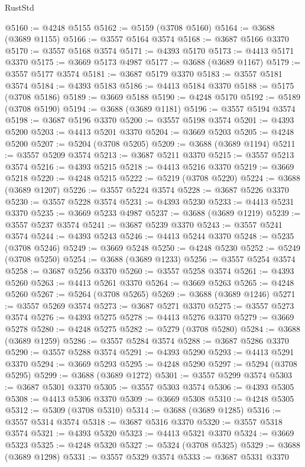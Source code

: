 \begin{lexlean}{RustStd}
\begin{coremodule}
@5160 := @4248 @5155
@5162 := @5159 (@3708 @5160)
@5164 := @3688 (@3689 @1155)
@5166 := @3557 @5164 @3574
@5168 := @3687 @5166 @3370
@5170 := @3557 @5168 @3574
@5171 := @4393 @5170
@5173 := @4413 @5171 @3370
@5175 := @3669 @5173 @4987
@5177 := @3688 (@3689 @1167)
@5179 := @3557 @5177 @3574
@5181 := @3687 @5179 @3370
@5183 := @3557 @5181 @3574
@5184 := @4393 @5183
@5186 := @4413 @5184 @3370
@5188 := @5175 (@3708 @5186)
@5189 := @3669 @5188
@5190 := @4248 @5170
@5192 := @5189 (@3708 @5190)
@5194 := @3688 (@3689 @1181)
@5196 := @3557 @5194 @3574
@5198 := @3687 @5196 @3370
@5200 := @3557 @5198 @3574
@5201 := @4393 @5200
@5203 := @4413 @5201 @3370
@5204 := @3669 @5203
@5205 := @4248 @5200
@5207 := @5204 (@3708 @5205)
@5209 := @3688 (@3689 @1194)
@5211 := @3557 @5209 @3574
@5213 := @3687 @5211 @3370
@5215 := @3557 @5213 @3574
@5216 := @4393 @5215
@5218 := @4413 @5216 @3370
@5219 := @3669 @5218
@5220 := @4248 @5215
@5222 := @5219 (@3708 @5220)
@5224 := @3688 (@3689 @1207)
@5226 := @3557 @5224 @3574
@5228 := @3687 @5226 @3370
@5230 := @3557 @5228 @3574
@5231 := @4393 @5230
@5233 := @4413 @5231 @3370
@5235 := @3669 @5233 @4987
@5237 := @3688 (@3689 @1219)
@5239 := @3557 @5237 @3574
@5241 := @3687 @5239 @3370
@5243 := @3557 @5241 @3574
@5244 := @4393 @5243
@5246 := @4413 @5244 @3370
@5248 := @5235 (@3708 @5246)
@5249 := @3669 @5248
@5250 := @4248 @5230
@5252 := @5249 (@3708 @5250)
@5254 := @3688 (@3689 @1233)
@5256 := @3557 @5254 @3574
@5258 := @3687 @5256 @3370
@5260 := @3557 @5258 @3574
@5261 := @4393 @5260
@5263 := @4413 @5261 @3370
@5264 := @3669 @5263
@5265 := @4248 @5260
@5267 := @5264 (@3708 @5265)
@5269 := @3688 (@3689 @1246)
@5271 := @3557 @5269 @3574
@5273 := @3687 @5271 @3370
@5275 := @3557 @5273 @3574
@5276 := @4393 @5275
@5278 := @4413 @5276 @3370
@5279 := @3669 @5278
@5280 := @4248 @5275
@5282 := @5279 (@3708 @5280)
@5284 := @3688 (@3689 @1259)
@5286 := @3557 @5284 @3574
@5288 := @3687 @5286 @3370
@5290 := @3557 @5288 @3574
@5291 := @4393 @5290
@5293 := @4413 @5291 @3370
@5294 := @3669 @5293
@5295 := @4248 @5290
@5297 := @5294 (@3708 @5295)
@5299 := @3688 (@3689 @1272)
@5301 := @3557 @5299 @3574
@5303 := @3687 @5301 @3370
@5305 := @3557 @5303 @3574
@5306 := @4393 @5305
@5308 := @4413 @5306 @3370
@5309 := @3669 @5308
@5310 := @4248 @5305
@5312 := @5309 (@3708 @5310)
@5314 := @3688 (@3689 @1285)
@5316 := @3557 @5314 @3574
@5318 := @3687 @5316 @3370
@5320 := @3557 @5318 @3574
@5321 := @4393 @5320
@5323 := @4413 @5321 @3370
@5324 := @3669 @5323
@5325 := @4248 @5320
@5327 := @5324 (@3708 @5325)
@5329 := @3688 (@3689 @1298)
@5331 := @3557 @5329 @3574
@5333 := @3687 @5331 @3370

\end{coremodule}
\end{lexlean}
